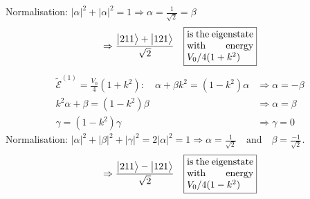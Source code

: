 \documentclass[12pt,fancychapters]{report}
\numberwithin{equation}{section}
\begin{document}
Normalisation: $\big|\alpha\big|^2 + \big|\alpha\big|^2 = 1 \Rightarrow \alpha = \frac{1}{
\sqrt{2}} = \beta$
\[
  \Rightarrow \frac{\big|211\big>+\big|121\big>}{\sqrt{2}}\quad \fbox{%
  \parbox{.2\textwidth}{%
  is the eigenstate with energy $V_0/4 (1+k^2)$}%
} 
\]
\begin{align*}
  \tilde{\mathcal{E}}^{(1)} = \frac{V_0}{4}\left(1+k^2\right):\quad \alpha +\beta k^2 = 
  \left(1-k^2\right)\alpha &\Rightarrow \alpha = -\beta\\
  k^2\alpha +\beta  = \left(1-k^2\right)\beta &\Rightarrow \alpha = \beta\\
  \gamma = \left(1-k^2\right)\gamma &\Rightarrow \gamma = 0
\end{align*}
\newpage
\clearpage
Normalisation: $\big|\alpha\big|^2 + \big|\beta\big|^2+\big|\gamma\big|^2 = 2\big|\alpha\big|^2=
1 \Rightarrow \alpha = \frac{1}{\sqrt{2}}\quad \text{and}\quad \beta=\frac{-1}{\sqrt{2}}$.\\
\[
  \Rightarrow \frac{\big|211\big>-\big|121\big>}{\sqrt{2}}\quad \fbox{%
  \parbox{.2\textwidth}{%
  is the eigenstate with energy $V_0/4 (1-k^2)$}%
} 
\]
\end{document}
